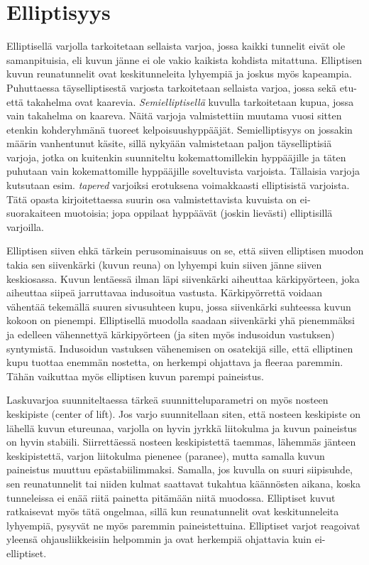 \section{ Elliptisyys }
\label{varjon-ominaisuudet-elliptisyys}


Elliptisellä varjolla tarkoitetaan sellaista varjoa, jossa kaikki tunnelit eivät ole samanpituisia, eli kuvun jänne ei ole vakio kaikista kohdista mitattuna. Elliptisen kuvun reunatunnelit ovat keskitunneleita lyhyempiä ja joskus myös kapeampia. Puhuttaessa täyselliptisestä varjosta tarkoitetaan sellaista varjoa, jossa sekä etu- että takahelma ovat kaarevia. \textit{Semielliptisellä} kuvulla tarkoitetaan kupua, jossa vain takahelma on kaareva. Näitä varjoja valmistettiin muutama vuosi sitten etenkin kohderyhmänä tuoreet kelpoisuushyppääjät. Semielliptisyys on jossakin määrin vanhentunut käsite, sillä nykyään valmistetaan paljon täyselliptisiä varjoja, jotka on kuitenkin suunniteltu kokemattomillekin hyppääjille ja täten puhutaan vain kokemattomille hyppääjille soveltuvista varjoista. Tällaisia varjoja kutsutaan esim. \textit{tapered} varjoiksi erotuksena voimakkaasti elliptisistä varjoista. Tätä opasta kirjoitettaessa suurin osa valmistettavista kuvuista on ei-suorakaiteen muotoisia; jopa oppilaat hyppäävät (joskin lievästi) elliptisillä varjoilla. 


Elliptisen siiven ehkä tärkein perusominaisuus on se, että siiven elliptisen muodon takia sen siivenkärki (kuvun reuna) on lyhyempi kuin siiven jänne siiven keskiosassa. Kuvun lentäessä ilman läpi siivenkärki aiheuttaa kärkipyörteen, joka aiheuttaa siipeä jarruttavaa indusoitua vastusta. Kärkipyörrettä voidaan vähentää tekemällä suuren sivusuhteen kupu, jossa siivenkärki suhteessa kuvun kokoon on pienempi. Elliptisellä muodolla saadaan siivenkärki yhä pienemmäksi ja edelleen vähennettyä kärkipyörteen (ja siten myös indusoidun vastuksen) syntymistä. Indusoidun vastuksen vähenemisen on osatekijä sille, että elliptinen kupu tuottaa enemmän nostetta, on herkempi ohjattava ja fleeraa paremmin. Tähän vaikuttaa myös elliptisen kuvun parempi paineistus. 


Laskuvarjoa suunniteltaessa tärkeä suunnitteluparametri on myös nosteen keskipiste (center of lift). Jos varjo suunnitellaan siten, että nosteen keskipiste on lähellä kuvun etureunaa, varjolla on hyvin jyrkkä liitokulma ja kuvun paineistus on hyvin stabiili. Siirrettäessä nosteen keskipistettä taemmas, lähemmäs jänteen keskipistettä, varjon liitokulma pienenee (paranee), mutta samalla kuvun paineistus muuttuu epästabiilimmaksi. Samalla, jos kuvulla on suuri siipisuhde, sen reunatunnelit tai niiden kulmat saattavat tukahtua käännösten aikana, koska tunneleissa ei enää riitä painetta pitämään niitä muodossa. Elliptiset kuvut ratkaisevat myös tätä ongelmaa, sillä kun reunatunnelit ovat keskitunneleita lyhyempiä, pysyvät ne myös paremmin paineistettuina. Elliptiset varjot reagoivat yleensä ohjausliikkeisiin helpommin ja ovat herkempiä ohjattavia kuin ei-elliptiset. 

